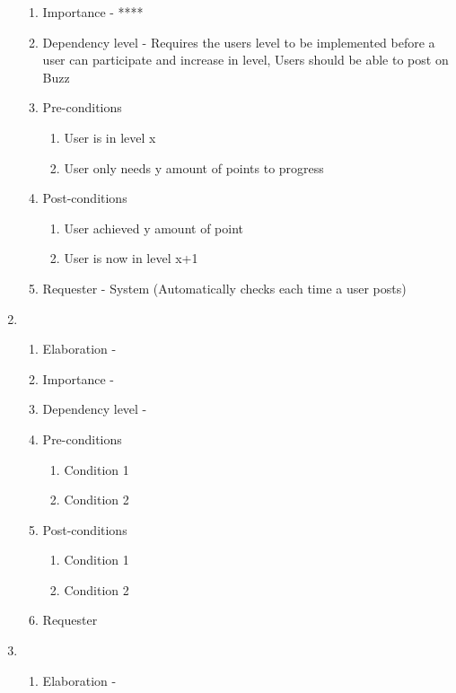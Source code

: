 \documentclass[12pt]{article}
\begin{document}
\begin{enumerate}
\begin{enumerate}
    \item Importance - ****
    \item Dependency level - Requires the users level to be implemented before a user can participate and increase in level, Users should be able to post on Buzz
    \item Pre-conditions
    \begin{enumerate}
    	\item User is in level x
    	\item User only needs y amount of points to progress
    \end{enumerate}
        \item Post-conditions
    \begin{enumerate}
    	\item User achieved y amount of point
    	\item User is now in level x+1
    \end{enumerate}
    \item Requester - System (Automatically checks each time a user posts)
  \end{enumerate}
\newpage %
   \item  %
  \begin{enumerate}
    \item Elaboration - 
    \item Importance - 
    \item Dependency level - 
    \item Pre-conditions
    \begin{enumerate}
    	\item Condition 1
    	\item Condition 2
    \end{enumerate}
        \item Post-conditions
    \begin{enumerate}
    	\item Condition 1
    	\item Condition 2
    \end{enumerate}
    \item Requester
  \end{enumerate}
\newpage %
   \item  %
  \begin{enumerate}
    \item Elaboration - 

\end{enumerate}
\end{enumerate}
\end{document}
